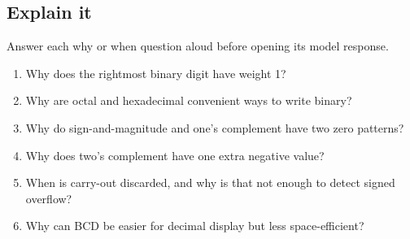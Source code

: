 \documentclass[11pt]{article}
\begin{document}
\begin{keepsection}
\section{Explain it}

Answer each why or when question aloud before opening its model response.

\begin{enumerate}
\item Why does the rightmost binary digit have weight 1?
\item Why are octal and hexadecimal convenient ways to write binary?
\item Why do sign-and-magnitude and one’s complement have two zero patterns?
\item Why does two’s complement have one extra negative value?
\item When is carry-out discarded, and why is that not enough to detect signed overflow?
\item Why can BCD be easier for decimal display but less space-efficient?
\end{enumerate}

\end{keepsection}

\clearpage
\end{document}

